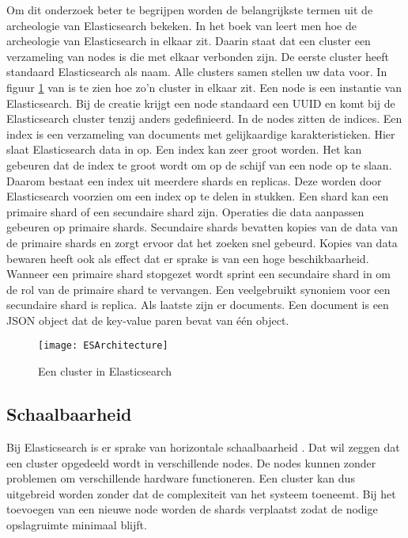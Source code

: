 Om dit onderzoek beter te begrijpen worden de belangrijkste termen uit de archeologie van Elasticsearch bekeken. In het boek van \textcite{Dixit2016} leert men hoe de archeologie van Elasticsearch in elkaar zit. Daarin staat dat een cluster een verzameling van nodes is die met elkaar verbonden zijn. De eerste cluster heeft standaard Elasticsearch als naam. Alle clusters samen stellen uw data voor. In figuur \ref{fig:ESArchitecture} van \textcite{Babaev2013} is te zien hoe zo'n cluster in elkaar zit. Een node is een instantie van Elasticsearch. Bij de creatie krijgt een node standaard een UUID en komt bij de Elasticsearch cluster tenzij anders gedefinieerd. In de nodes zitten de indices. Een index is een verzameling van documents met gelijkaardige karakteristieken. Hier slaat Elasticsearch data in op. Een index kan zeer groot worden. Het kan gebeuren dat de index te groot wordt om op de schijf van een node op te slaan. Daarom bestaat een index uit meerdere shards en replicas. Deze worden door Elasticsearch voorzien om een index op te delen in stukken. Een shard kan een primaire shard of een secundaire shard zijn. Operaties die data aanpassen gebeuren op primaire shards. Secundaire shards bevatten kopies van de data van de primaire shards en zorgt ervoor dat het zoeken snel gebeurd. Kopies van data bewaren heeft ook als effect dat er sprake is van een hoge beschikbaarheid. Wanneer een primaire shard stopgezet wordt sprint een secundaire shard in om de rol van de primaire shard te vervangen. Een veelgebruikt synoniem voor een secundaire shard is replica. Als laatste zijn er documents. Een document is een JSON object dat de key-value paren bevat van één object.

\begin{figure}
	\centering
	\texttt{[image: ESArchitecture]}
	\caption{Een cluster in Elasticsearch}
	\label{fig:ESArchitecture}
\end{figure}

\subsection{Schaalbaarheid}

Bij Elasticsearch is er sprake van horizontale schaalbaarheid \autocite{Dixit2013}. Dat wil zeggen dat een cluster opgedeeld wordt in verschillende nodes. De nodes kunnen zonder problemen om verschillende hardware functioneren. Een cluster kan dus uitgebreid worden zonder dat de complexiteit van het systeem toeneemt. Bij het toevoegen van een nieuwe node worden de shards verplaatst zodat de nodige opslagruimte minimaal blijft.

